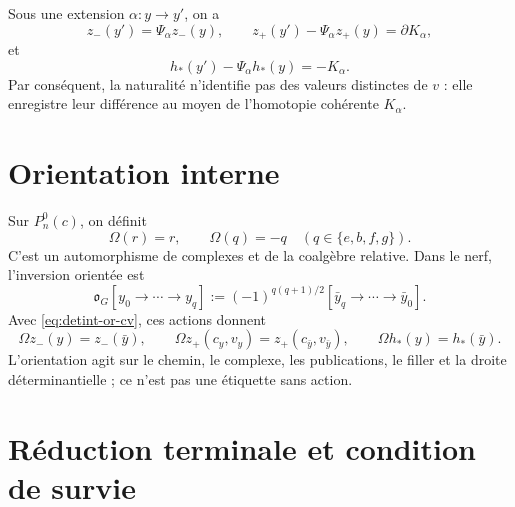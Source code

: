 Sous une extension \(\alpha:y\to y'\), on a
\begin{equation}\label{eq:detint-z-natural}
 z_-(y')=\Psi_\alpha z_-(y),
 \qquad
 z_+(y')-\Psi_\alpha z_+(y)=\partial K_\alpha,
\end{equation}
et
\begin{equation}\label{eq:detint-h-natural}
 h_*(y')-\Psi_\alpha h_*(y)=-K_\alpha.
\end{equation}
Par conséquent, la naturalité n'identifie pas des valeurs distinctes de \(v\) : elle enregistre
leur différence au moyen de l'homotopie cohérente \(K_\alpha\).

\section{Orientation interne}

Sur \(P_n^0(c)\), on définit
\begin{equation}\label{eq:detint-omega-p}
 \Omega(r)=r,
 \qquad
 \Omega(q)=-q\quad(q\in\{e,b,f,g\}).
\end{equation}
C'est un automorphisme de complexes et de la coalgèbre relative. Dans le nerf,
l'inversion orientée est
\begin{equation}\label{eq:detint-omega-g}
 \mathfrak o_G[y_0\to\cdots\to y_q]
 :=(-1)^{q(q+1)/2}
 [\bar y_q\to\cdots\to\bar y_0].
\end{equation}
Avec \eqref{eq:detint-or-cv}, ces actions donnent
\begin{equation}\label{eq:detint-or-z-h}
 \Omega z_-(y)=z_-(\bar y),
 \qquad
 \Omega z_+(c_y,v_y)=z_+(c_{\bar y},v_{\bar y}),
 \qquad
 \Omega h_*(y)=h_*(\bar y).
\end{equation}
L'orientation agit sur le chemin, le complexe, les publications, le filler et la droite
déterminantielle ; ce n'est pas une étiquette sans action.

\section{Réduction terminale et condition de survie}
\label{sec:detint-terminal}

